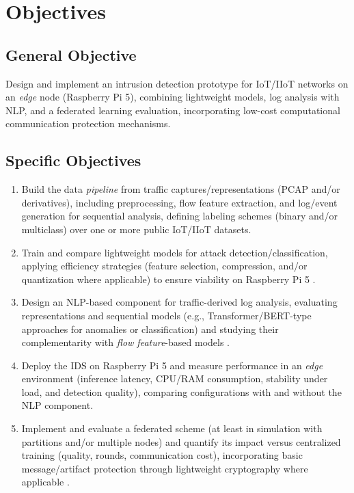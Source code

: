 \section{Objectives}

\subsection{General Objective}
Design and implement an intrusion detection prototype for IoT/IIoT networks on an \textit{edge} node (Raspberry Pi 5), combining lightweight models, log analysis with NLP, and a federated learning evaluation, incorporating low-cost computational communication protection mechanisms.

\subsection{Specific Objectives}
\begin{enumerate}
    \item Build the data \textit{pipeline} from traffic captures/representations (PCAP and/or derivatives), including preprocessing, flow feature extraction, and log/event generation for sequential analysis, defining labeling schemes (binary and/or multiclass) over one or more public IoT/IIoT datasets.

    \item Train and compare lightweight models for attack detection/classification, applying efficiency strategies (feature selection, compression, and/or quantization where applicable) to ensure viability on Raspberry Pi 5 \cite{DuttaBharali2021_TinyMLSurvey}.

    \item Design an NLP-based component for traffic-derived log analysis, evaluating representations and sequential models (e.g., Transformer/BERT-type approaches for anomalies or classification) and studying their complementarity with \textit{flow feature}-based models \cite{LogBERT2021, LTAnomaly2023, Yadav2023_LLM_Zeek}.

    \item Deploy the IDS on Raspberry Pi 5 and measure performance in an \textit{edge} environment (inference latency, CPU/RAM consumption, stability under load, and detection quality), comparing configurations with and without the NLP component.

    \item Implement and evaluate a federated scheme (at least in simulation with partitions and/or multiple nodes) and quantify its impact versus centralized training (quality, rounds, communication cost), incorporating basic message/artifact protection through lightweight cryptography where applicable \cite{Imteaj2022_FL_ResourceConstrainedSurvey, NIST_SP800232_2025}.
\end{enumerate}

